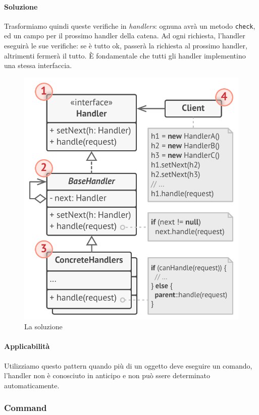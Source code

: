 \documentclass[11pt]{article}
\newcommand{\code}[1]{\texttt{#1}}
\begin{document}
\paragraph{Soluzione}
Trasformiamo quindi queste verifiche in \textit{handlers}: ognuna avrà un metodo \code{check}, ed un campo per il prossimo handler della catena. Ad ogni richiesta, l'handler eseguirà le sue verifiche: se è tutto ok, passerà la richiesta al prossimo handler, altrimenti fermerà il tutto. È fondamentale che tutti gli handler implementino una stessa interfaccia. 
\begin{figure}[H]
    \includegraphics[width=\linewidth]{res/teoria/Handler.png}
    \caption{La soluzione}
\end{figure}
\paragraph{Applicabilità}
Utilizziamo questo pattern quando più di un oggetto deve eseguire un comando, l'handler non è conosciuto in anticipo e non può ssere determinato automaticamente.
\subsubsection{Command}
\end{document}
